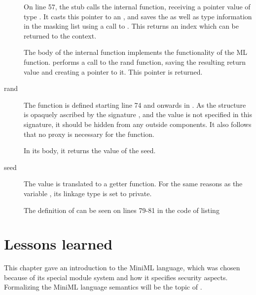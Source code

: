 \begin{description}
On line 57, the stub calls the internal function, receiving a pointer value of type .
It casts this pointer to an , and saves the  as well as type information in the masking list using a call to .
This returns an index which can be returned to the context.


The body of the internal function  implements the functionality of the ML  function.
 performs a call to the rand function, saving the resulting return value and creating a pointer to it.
This pointer is returned.

\item[rand] The function  is defined starting line 74 and onwards in .
As the structure  is opaquely ascribed by the signature , and the value  is not specified in this signature, it should be hidden from any outside components. 
It also follows that no proxy is necessary for the  function.

In its body, it returns the value of the seed.

\item[seed] The value  is translated to a getter function.
For the same reasons as the variable , its linkage type is set to private. 

The definition of  can be seen on lines 79-81 in the code of listing~
\end{description}

\section{Lessons learned}

This chapter gave an introduction to the \mbox{MiniML} language, which was chosen because of its special module system and how it specifies security aspects. Formalizing the \mbox{MiniML} language semantics will be the topic of \label{chapter:formalspecification}.

